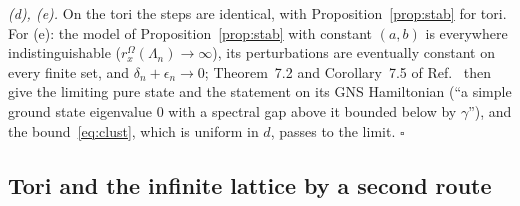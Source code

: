\documentclass[aps,prx,onecolumn,10pt,nofootinbib,longbibliography,floatfix]{revtex4-2}
\theoremstyle{remark}
\begin{document}
\emph{(d), (e).} On the tori the steps are identical, with Proposition~\ref{prop:stab} for tori. For (e): the model
of Proposition~\ref{prop:stab} with constant $(a,b)$ is everywhere indistinguishable ($r^\Omega_x(\Lambda_n)\to\infty$),
its perturbations are eventually constant on every finite set, and $\delta_n+\epsilon_n\to0$; Theorem~7.2 and %
Corollary~7.5 of Ref.~\cite{nsy2022} then give the limiting pure state and the statement on its GNS Hamiltonian %
(``a simple ground state eigenvalue $0$ with a spectral gap above it bounded below by $\gamma$''), and the %
bound~\eqref{eq:clust}, which is uniform in $d$, passes to the limit. \hfill$\square$

\subsection{Tori and the infinite lattice by a second route}
\end{document}
